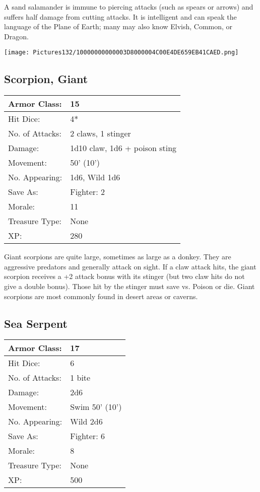 \documentclass[a4paper,twoside,openany,10pt]{book}
\begin{document}
\begin{multicols}{2}
A sand salamander is immune to piercing attacks (such as spears or arrows) and suffers half damage from cutting attacks. It is intelligent and can speak the language of the Plane of Earth; many may also know Elvish, Common, or Dragon.

\begin{center} \texttt{[image: Pictures132/10000000000003D8000004C00E4DE659EB41CAED.png]} \end{center}


\subsection*{Scorpion, Giant}\label{scorpion-giant}

\begin{tabularx}{0.50\textwidth}{@{}lX@{}}
Armor Class: & 15 \\\hline
Hit Dice: & 4* \\\hline
No. of Attacks: & 2 claws, 1 stinger \\\hline
Damage: & 1d10 claw, 1d6 + poison sting \\\hline
Movement: & 50' (10') \\\hline
No. Appearing: & 1d6, Wild 1d6 \\\hline
Save As: & Fighter: 2 \\\hline
Morale: & 11 \\\hline
Treasure Type: & None \\\hline
XP: & 280 \\\hline
\end{tabularx}\medskip

Giant scorpions are quite large, sometimes as large as a donkey. They are aggressive predators and generally attack on sight. If a claw attack hits, the giant scorpion receives a +2 attack bonus with its stinger (but two claw hits do not give a double bonus). Those hit by the stinger must save vs. Poison or die. Giant scorpions are most commonly found in desert areas or caverns.

\subsection*{Sea Serpent}\label{sea-serpent}

\begin{tabularx}{0.50\textwidth}{@{}lX@{}}
Armor Class: & 17 \\\hline
Hit Dice: & 6 \\\hline
No. of Attacks: & 1 bite \\\hline
Damage: & 2d6 \\\hline
Movement: & Swim 50' (10') \\\hline
No. Appearing: & Wild 2d6 \\\hline
Save As: & Fighter: 6 \\\hline
Morale: & 8 \\\hline
Treasure Type: & None \\\hline
XP: & 500 \\\hline
\end{tabularx}\medskip


\end{multicols}
\end{document}
